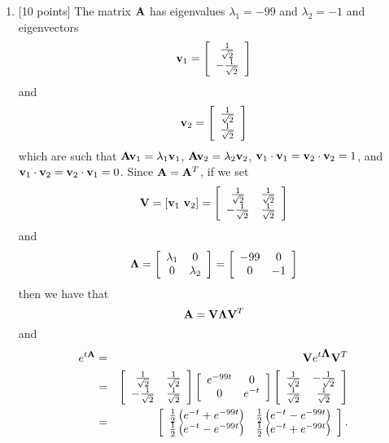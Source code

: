 \begin{solution}
\begin{enumerate}
\item {[10 points]} The matrix ${\bf A}$ has eigenvalues $\lambda_1 = -99$ and $\lambda_2 = -1$ and eigenvectors
\[
{\bf v}_1 = \left[\begin{array}{c}{1\over\sqrt{2}} \\ -{1\over\sqrt{2}}\end{array}\right]
\]
and
\[
{\bf v}_2 = \left[\begin{array}{c}{1\over\sqrt{2}} \\ {1\over\sqrt{2}}\end{array}\right]
\]
which are such that ${\bf A}{\bf v}_1=\lambda_1{\bf v}_1$, ${\bf A}{\bf v}_2=\lambda_2{\bf v}_2$, ${\bf v}_1\cdot{\bf v}_1={\bf v}_2\cdot{\bf v}_2=1$,  and ${\bf v}_1\cdot{\bf v}_2={\bf v}_2\cdot{\bf v}_1=0$. Since ${\bf A}={\bf A}^T$, if we set
\[
\BV = [\Bv_1\ \Bv_2]=\left[\begin{array}{cc}{1\over\sqrt{2}} & {1\over\sqrt{2}} \\ -{1\over\sqrt{2}} & {1\over\sqrt{2}}\end{array}\right]
\]
and
\[
\mbox{\boldmath$\Lambda$} = \left[\begin{array}{cc}\lambda_1 & 0 \\ 0 & \lambda_2\end{array}\right]=\left[\begin{array}{cc}-99 & 0 \\ 0 & -1\end{array}\right]
\]
then we have that
\[
{\bf A} = {\bf V}\mbox{\boldmath$\Lambda$}{\bf V}^T
\]
and
\begin{eqnarray*}
e^{t\BA}&=&\BV e^{t\BLambda} \BV^T
\\
&=&\left[\begin{array}{cc}{1\over\sqrt{2}} & {1\over\sqrt{2}} \\ -{1\over\sqrt{2}} & {1\over\sqrt{2}}\end{array}\right] \left[\begin{array}{cc}e^{-99t} & 0 \\ 0 & e^{-t}\end{array}\right] \left[\begin{array}{cc}{1\over\sqrt{2}} & -{1\over\sqrt{2}} \\ {1\over\sqrt{2}} & {1\over\sqrt{2}}\end{array}\right]
\\
&=&\left[\begin{array}{cc}{1\over2}\left(e^{-t}+e^{-99t}\right) & {1\over2}\left(e^{-t} - e^{-99t}\right) \\ {1\over2}\left(e^{-t}-e^{-99t}\right) & {1\over2}\left(e^{-t}+e^{-99t}\right)\end{array}\right].

\end{eqnarray*}
\end{enumerate}
\end{solution}
